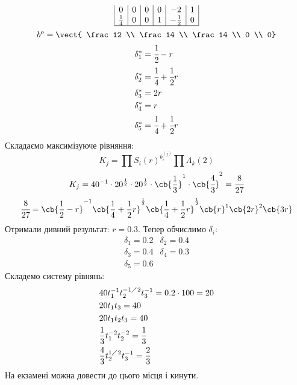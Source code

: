 \begin{tsk}
\begin{equation*}
\begin{array}{|c|c|c|c|c|c|}
		0 & 0 & 0 & 0 & -2 & 1 \\
		\frac14 & 0 & 0 & 1 & -\frac12 & 0\\
		\hline
	\end{array}
\end{equation*}
\begin{equation}
	b^o = \vect{ \frac12 \\ \frac 14 \\ \frac14 \\ 0 \\ 0}
\end{equation}
\begin{eqnarray}
	&\delta_1^\ast = \cfrac12 - r\\
	&\delta_2^\ast = \cfrac14 + \cfrac12 r \\
	&\delta_3^\ast = 2 r\\
	&\delta_4^\ast = r \\
	&\delta_5^\ast = \cfrac14 + \cfrac12 r
\end{eqnarray}
Складаємо максимізуюче рівняння:
\begin{equation}
	K_j = \prod S_i(r)^{b_i^{(j)}} \prod \Lambda_k(2)
\end{equation}
\begin{equation}
	K_j = 40^{-1}\cdot 20^{\frac12} \cdot 20^{\frac12} \cdot \cb{\frac13}^{1}\cdot\cb{\cfrac43}^2 = \cfrac8{27}
\end{equation}
\begin{equation}
	\cfrac8{27} = \cb{\frac12 -r}^{-1}\cb{\frac14 + \frac12 r }^{\frac12} \cb{\frac14 + \frac12 r}^{\frac12} \cb{r}^1\cb{2r}^2 \cb{3r}
\end{equation}
Отримали дивний результат: $r=0.3$. Тепер обчислимо $\delta_i$:
\begin{eqnarray*}
	\delta_1 = 0.2 & \delta_2 = 0.4 \\
	\delta_3 = 0.4 & \delta_4 = 0.3 \\
	\delta_5 = 0.6
\end{eqnarray*}
Складемо систему рівнянь:
\begin{eqnarray}
	&40t_1^{-1}t_2^{-1\diagup 2} t_3^{-1} = 0.2 \cdot 100 = 20 \\
	&20t_1t_3 = 40\\
	&20t_1t_2t_3 = 40\\
	&\frac13 t_1^{-2} t_2^{-2} = \frac13 \\
	&\frac43 t_2^{1\diagup2} t_3^{-1} = \frac23
\end{eqnarray}
На екзамені можна довести до цього місця і кинути.
\end{tsk}
